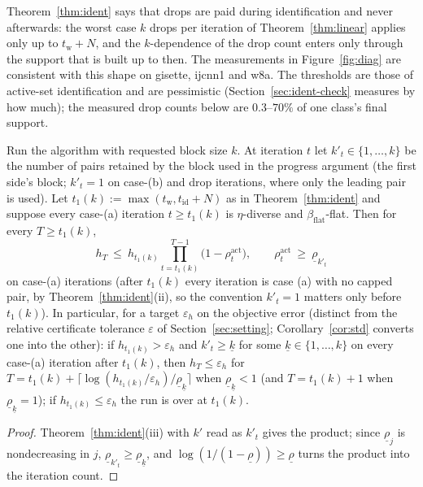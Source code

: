 Theorem~\ref{thm:ident} says that drops are paid during identification
and never afterwards: the worst case $k$ drops per iteration of
Theorem~\ref{thm:linear} applies only up to $t_{\mathrm w}+N$, and the
$k$-dependence of the drop count enters only through the support that
is built up to then. The measurements in Figure~\ref{fig:diag} are
consistent with this shape on gisette, ijcnn1 and w8a. The thresholds are those of active-set
identification and are pessimistic (Section~\ref{sec:ident-check}
measures by how much); the measured drop counts below are
$0.3$--$70\%$ of one class's final support.

\begin{corollary}\label{cor:work}
Run the algorithm with requested block size $k$. At iteration $t$ let
$k'_t\in\{1,\dots,k\}$ be the number of pairs retained by the block used
in the progress argument (the first side's block; $k'_t=1$ on case-(b)
and drop iterations, where only the leading pair is used). Let
$t_1(k):=\max(t_{\mathrm w},t_{\mathrm{id}}+N)$ as in
Theorem~\ref{thm:ident} and suppose every case-(a) iteration
$t\ge t_1(k)$ is $\eta$-diverse and $\beta_{\mathrm{flat}}$-flat. Then
for every $T\ge t_1(k)$,
\[
h_T\ \le\ h_{t_1(k)}\prod_{t=t_1(k)}^{T-1}\big(1-\rho^{\mathrm{act}}_t\big),\qquad
\rho^{\mathrm{act}}_t\ \ge\ \underline\rho_{k'_t}
\]
on case-(a) iterations (after $t_1(k)$ every iteration is case (a)
with no capped pair, by Theorem~\ref{thm:ident}(ii), so the convention
$k'_t=1$ matters only before $t_1(k)$). In particular, for a target $\varepsilon_h$ on the objective error
(distinct from the relative certificate tolerance $\varepsilon$ of
Section~\ref{sec:setting}; Corollary~\ref{cor:std} converts one into
the other): if $h_{t_1(k)}>\varepsilon_h$ and $k'_t\ge\underline k$ for
some $\underline k\in\{1,\dots,k\}$ on every case-(a) iteration after
$t_1(k)$, then $h_T\le\varepsilon_h$ for
$T=t_1(k)+\big\lceil\log(h_{t_1(k)}/\varepsilon_h)/\underline\rho_{\underline k}\big\rceil$
when $\underline\rho_{\underline k}<1$ (and $T=t_1(k)+1$ when
$\underline\rho_{\underline k}=1$); if $h_{t_1(k)}\le\varepsilon_h$ the
run is over at $t_1(k)$.
\end{corollary}
\begin{proof}
Theorem~\ref{thm:ident}(iii) with $k'$ read as $k'_t$ gives the product;
since $\underline\rho_j$ is nondecreasing in $j$,
$\underline\rho_{k'_t}\ge\underline\rho_{\underline k}$, and
$\log(1/(1-\underline\rho))\ge\underline\rho$ turns the product into the
iteration count.
\end{proof}

